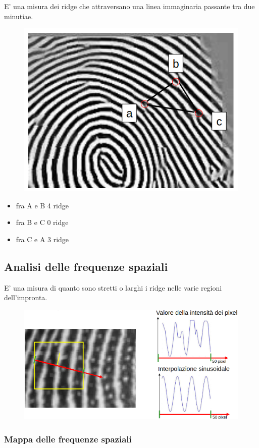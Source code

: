 E’ una misura dei ridge che attraversano una
linea immaginaria passante tra due minutiae.

\begin{figure}[ht]
    \centering
    \includegraphics[width=0.5\linewidth]{chapters/images-chap6/ridge-counting.png}
\end{figure}

\begin{itemize}
    \item fra A e B 4 ridge
    \item fra B e C 0 ridge
    \item fra C e A 3 ridge
\end{itemize}

\subsection{Analisi delle frequenze spaziali}

E’ una misura di quanto sono stretti o larghi i
ridge nelle varie regioni dell’impronta.

\begin{figure}[ht]
    \centering
    \includegraphics[width=1\linewidth]{chapters/images-chap6/ridge-freq.png}
\end{figure}

\subsubsection{Mappa delle frequenze spaziali}

